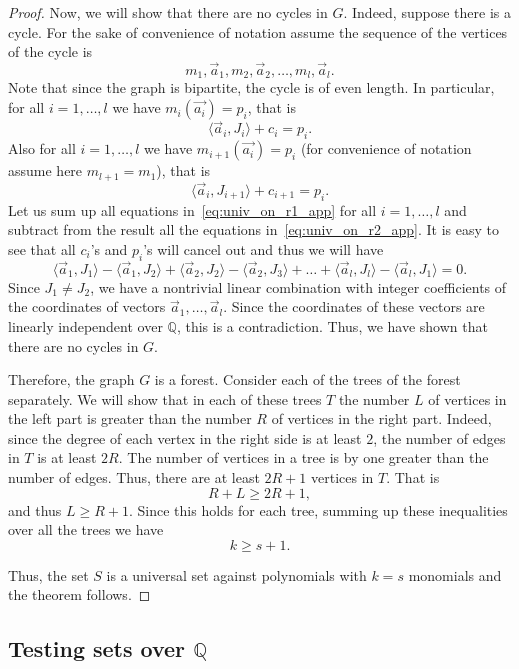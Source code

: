 \documentclass[11pt]{article}
\newcommand{\bb}[1]{\mathbb{#1}}
\begin{document}
\begin{proof}
Now, we will show that there are no cycles in $G$. Indeed, suppose there is a cycle. For the sake of convenience of notation assume the sequence of the vertices of the cycle is
$$
m_1, \vec{a}_1, m_2, \vec{a}_2, \ldots, m_l, \vec{a}_l.
$$
Note that since the graph is bipartite, the cycle is of even length.
In particular, for all $i=1,\ldots, l$ we have $m_i(\vec{a_i}) = p_i$, that is
\begin{equation} \label{eq:univ_on_r1_app}
\langle\vec{a}_i, J_i\rangle + c_i = p_i.
\end{equation}
Also for all $i=1,\ldots, l$ we have $m_{i+1}(\vec{a_i}) = p_i$ (for convenience of notation assume here $m_{l+1}=m_1$), that is
\begin{equation} \label{eq:univ_on_r2_app}
\langle\vec{a}_i, J_{i+1}\rangle + c_{i+1} = p_i.
\end{equation} 
Let us sum up all equations in~\eqref{eq:univ_on_r1_app} for all $i=1,\ldots,l$ and subtract from the result all the equations in~\eqref{eq:univ_on_r2_app}.
It is easy to see that all $c_i$'s and $p_i$'s will cancel out and thus we will have
$$
\langle \vec{a}_1, J_1\rangle - \langle \vec{a}_1, J_2\rangle + \langle \vec{a}_2, J_2\rangle - \langle \vec{a}_2, J_3\rangle + \ldots + \langle \vec{a}_l, J_l\rangle - \langle \vec{a}_l, J_1\rangle = 0.
$$
Since $J_1 \neq J_2$, we have a nontrivial linear combination with integer coefficients of the coordinates of vectors $\vec{a}_1,\ldots, \vec{a}_l$. Since the coordinates of these vectors are linearly independent over $\bb{Q}$, this is a contradiction.
Thus, we have shown that there are no cycles in $G$.

Therefore, the graph $G$ is a forest. Consider each of the trees of the forest separately. We will show that in each of these trees $T$ the number $L$ of vertices in the left part is greater than the number $R$ of vertices in the right part. Indeed, since the degree of each vertex in the right side is at least $2$, the number of edges in $T$ is at least $2R$. The number of vertices in a tree is by one greater than the number of edges. Thus, there are at least $2R+1$ vertices in $T$.
That is
$$
R+L \geq 2R+1,
$$
and thus $L \geq R+1$.
Since this holds for each tree, summing up these inequalities over all the trees we have
$$
k \geq s + 1.
$$

Thus, the set $S$ is a universal set against polynomials with $k=s$ monomials and the theorem follows.
\end{proof}

\subsection{Testing sets over $\bb{Q}$}
\end{document}
